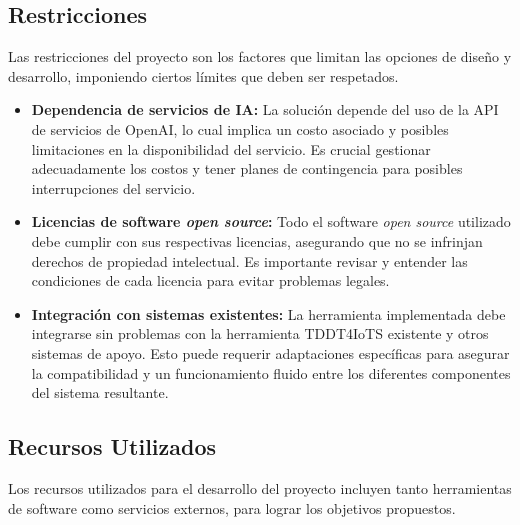 \subsection{Restricciones}

Las restricciones del proyecto son los factores que limitan las opciones de diseño y desarrollo, imponiendo ciertos límites que deben ser respetados.

\begin{itemize}
	\item \textbf{Dependencia de servicios de IA:}
	La solución depende del uso de la API de servicios de OpenAI, lo cual implica un costo asociado y posibles limitaciones en la disponibilidad del servicio. Es crucial gestionar adecuadamente los costos y tener planes de contingencia para posibles interrupciones del servicio.
	
	\item \textbf{Licencias de software \textit{open source}:}
	Todo el software \textit{open source} utilizado debe cumplir con sus respectivas licencias, asegurando que no se infrinjan derechos de propiedad intelectual. Es importante revisar y entender las condiciones de cada licencia para evitar problemas legales.
	
	\item \textbf{Integración con sistemas existentes:}
	La herramienta implementada debe integrarse sin problemas con la herramienta TDDT4IoTS existente y otros sistemas de apoyo. Esto puede requerir adaptaciones específicas para asegurar la compatibilidad y un funcionamiento fluido entre los diferentes componentes del sistema resultante.
\end{itemize}

\subsection{Recursos Utilizados}

Los recursos utilizados para el desarrollo del proyecto incluyen tanto herramientas de software como servicios externos, para lograr los objetivos propuestos.

